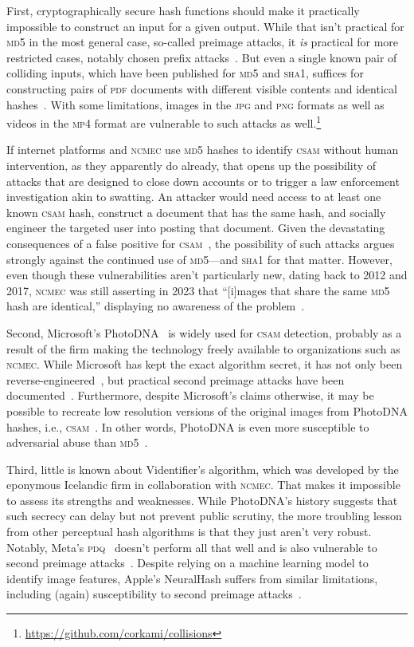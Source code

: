 \documentclass[nonacm,screen]{acmart}
\newcommand\V[1]{\textsc{\MakeLowercase{#1}}}
\begin{document}
\begin{itemize}
{First, cryptographically secure hash functions should make it practically
impossible to construct an input for a given output. While that isn't practical
for \V{MD5} in the most general case, so-called preimage attacks, it \emph{is}
practical for more restricted cases, notably chosen prefix
attacks~\cite{StevensLenstraea2012}. But even a single known pair of colliding
inputs, which have been published for \V{MD5} and \V{SHA1}, suffices for
constructing pairs of \V{PDF} documents with different visible contents and
identical hashes~\cite{LeurentPeyrin2020,StevensBurszteinea2017}. With some
limitations, images in the \V{JPG} and \V{PNG} formats as well as videos in the
\V{MP4} format are vulnerable to such attacks as
well.\footnote{\url{https://github.com/corkami/collisions}}

If internet platforms and \V{NCMEC} use \V{MD5} hashes to identify \V{CSAM}
without human intervention, as they apparently do already, that opens up the
possibility of attacks that are designed to close down accounts or to trigger a
law enforcement investigation akin to swatting. An attacker would need access to
at least one known \V{CSAM} hash, construct a document that has the same hash,
and socially engineer the targeted user into posting that document. Given the
devastating consequences of a false positive for \V{CSAM}~\cite{Hill2022}, the
possibility of such attacks argues strongly against the continued use of
\V{MD5}---and \V{SHA1} for that matter. However, even though these
vulnerabilities aren't particularly new, dating back to 2012 and 2017, \V{NCMEC}
was still asserting in 2023 that ``[i]mages that share the same \V{MD5} hash are
identical,'' displaying no awareness of the problem~\cite{NCMEC2024}.

Second, Microsoft's PhotoDNA~\cite{Farid2018} is widely used for \V{CSAM}
detection, probably as a result of the firm making the technology freely
available to organizations such as \V{NCMEC}. While Microsoft has kept the exact
algorithm secret, it has not only been reverse-engineered~\cite{Krawetz2021a},
but practical second preimage attacks have been
documented~\cite{ProkosJoisea2021}. Furthermore, despite Microsoft's claims
otherwise, it may be possible to recreate low resolution versions of the
original images from PhotoDNA hashes, i.e., \V{CSAM}~\cite{Athalye2021}. In
other words, PhotoDNA is even more susceptible to adversarial abuse than
\V{MD5}~\cite{Steinebach2023}.

Third, little is known about Videntifier's algorithm, which was developed by the
eponymous Icelandic firm in collaboration with \V{NCMEC}. That makes it
impossible to assess its strengths and weaknesses. While PhotoDNA's history
suggests that such secrecy can delay but not prevent public scrutiny, the more
troubling lesson from other perceptual hash algorithms is that they just aren't
very robust. Notably, Meta's \V{PDQ}~\cite{DavisRosen2019} doesn't perform all
that well and is also vulnerable to second preimage
attacks~\cite{Krawetz2022,ProkosJoisea2021}. Despite relying on a machine
learning model to identify image features, Apple's NeuralHash suffers from
similar limitations, including (again) susceptibility to second preimage
attacks~\cite{StruppekHintersdorfea2022}.

}
\end{itemize}
\end{document}
